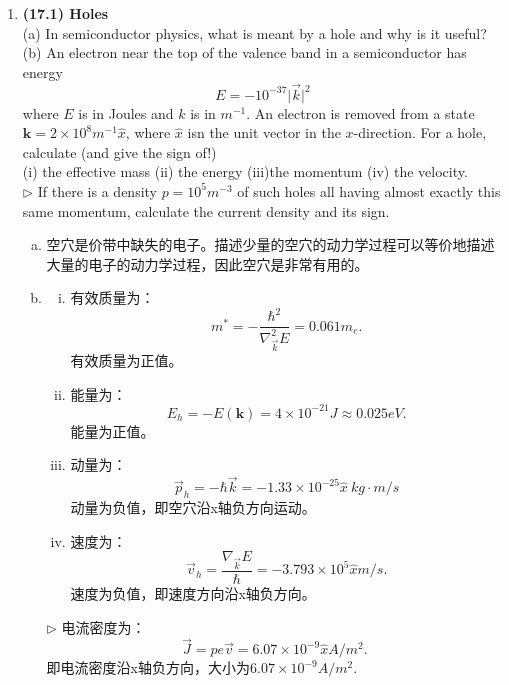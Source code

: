 \documentclass[reqno,a4paper,12pt]{amsart}
\begin{document}
\begin{enumerate}[1.]
\begin{tcolorbox}[breakable, colback = black!5!white, colframe = black]
\begin{enumerate}[(a)]
\end{enumerate}
\end{tcolorbox}

\item \textbf{(17.1) Holes} \\
(a) In semiconductor physics, what is meant by a hole and why is it useful? \\
(b) An electron near the top of the valence band in a semiconductor has energy 
\[
	E = -10^{-37}\vert \vec{k} \vert^2
\]
where $E$ is in Joules and $k$ is in $m^{-1}$. An electron is removed from a state $\mathbf{k} = 2\times 10^8 m^{-1}\hat{x}$, where $\hat{x}$ isn the unit vector in the $x$-direction. For a hole, calculate (and give the sign of!) \\
(i) the effective mass (ii) the energy (iii)the momentum (iv) the velocity. \\
$\triangleright$ If there is a density $p = 10^5m^{-3}$ of such holes all having almost exactly this same momentum, calculate the current density and its sign.
\begin{tcolorbox}[breakable, colback = black!5!white, colframe = black]
\begin{enumerate}[(a)]
\item 空穴是价带中缺失的电子。描述少量的空穴的动力学过程可以等价地描述大量的电子的动力学过程，因此空穴是非常有用的。

\item 
\begin{enumerate}[(i)]
\item 有效质量为：	
\[
	m^* = -\frac{\hbar^2}{\nabla_{\vec{k}}^2 E} = 0.061m_e.
\]
有效质量为正值。
\item 能量为：
\[
	E_h = -E(\mathbf{k}) = 4\times 10^{-21}J \approx 0.025eV.
\]
能量为正值。
\item 动量为：
\[
	\vec{p}_h = -\hbar \vec{k} = -1.33\times 10^{-25}\hat{x} ~ kg\cdot m /s
\]
动量为负值，即空穴沿x轴负方向运动。
\item 速度为：
\[
	\vec{v}_h = \frac{\nabla_{\vec{k}}E}{\hbar} = -3.793 \times 10^{5}\hat{x} m/s.
\]
速度为负值，即速度方向沿x轴负方向。 
\end{enumerate}

$\triangleright$ 电流密度为：
\[
	\vec{J} = pe\vec{v} = 6.07 \times 10^{-9} \hat{x} A/m^2.
\]
即电流密度沿x轴负方向，大小为$6.07 \times 10^{-9} A/m^2$.
\end{enumerate}
\end{tcolorbox}


\end{enumerate}
\end{document}
